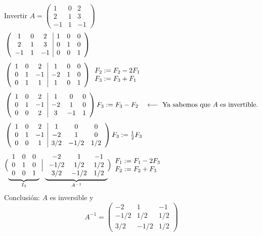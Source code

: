 \documentclass[11pt,a4paper]{article}
\begin{document}
\begin{ejemplo}
Invertir $A=\begin{pmatrix}1&0&2\\2&1&3\\-1&1&-1\end{pmatrix}$
\begin{align*}
&\left(\begin{array}{ccc|ccc}1&0&2&1&0&0\\2&1&3&0&1&0\\-1&1&-1&0&0&1\end{array}\right)\\[4pt]
&\left(\begin{array}{ccc|ccc}1&0&2&1&0&0\\0&1&-1&-2&1&0\\0&1&1&1&0&1\end{array}\right)
\begin{array}{l}F_2:=F_2-2F_1\\F_3:=F_3+F_1\end{array}\\[4pt]
&\left(\begin{array}{ccc|ccc}1&0&2&1&0&0\\0&1&-1&-2&1&0\\0&0&2&3&-1&1\end{array}\right)
F_3:=F_3-F_2\quad\longleftarrow\text{ Ya sabemos que $A$ es invertible.}\\[4pt]
&\left(\begin{array}{ccc|ccc}1&0&2&1&0&0\\0&1&-1&-2&1&0\\0&0&1&3/2&-1/2&1/2\end{array}\right)
F_3:=\tfrac12F_3\\[4pt]
&\Bigl(\underbrace{\begin{array}{ccc}1&0&0\\0&1&0\\0&0&1\end{array}}_{I_3}\Bigm|
\underbrace{\begin{array}{ccc}-2&1&-1\\-1/2&1/2&1/2\\3/2&-1/2&1/2\end{array}}_{A^{-1}}\Bigr)
\begin{array}{l}F_1:=F_1-2F_3\\F_2:=F_2+F_3\end{array}
\end{align*}
Conclusión: $A$ es inversible y
\[
A^{-1}=\begin{pmatrix}-2&1&-1\\-1/2&1/2&1/2\\3/2&-1/2&1/2\end{pmatrix}
\]
\end{ejemplo}
\end{document}

